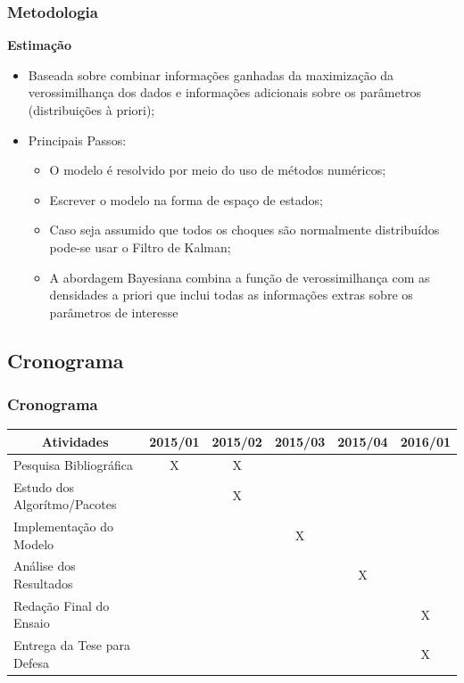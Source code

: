 \documentclass[aspectratio=169]{beamer}
\begin{document}
\begin{frame}\frametitle{Metodologia}
  \textbf{Estimação}
  \begin{itemize}
  \item Baseada sobre combinar informações ganhadas da maximização da verossimilhança dos dados e informações adicionais sobre os parâmetros (distribuições à priori);
  \item Principais Passos:
    \begin{itemize}
    \item O modelo é resolvido por meio do uso de métodos numéricos;
    \item Escrever o modelo na forma de espaço de estados;
    \item Caso seja assumido que todos os choques são normalmente distribuídos pode-se usar o Filtro de Kalman;
    \item A abordagem Bayesiana combina a função de verossimilhança com as densidades a priori que inclui todas as informações extras sobre os parâmetros de interesse
    \end{itemize}
  \end{itemize}
\end{frame}

\subsection{Cronograma}

\begin{frame}\frametitle{Cronograma}
\begin{table}[h]
\begin{tabular}{llllll}
\hline
\multicolumn{1}{c}{\textbf{Atividades}} & 2015/01               & 2015/02               & 2015/03               & 2015/04               & 2016/01               \\ \hline
Pesquisa Bibliográfica                  & \multicolumn{1}{c}{X} & \multicolumn{1}{c}{X} &                       &                       &                       \\
Estudo dos Algorítmo/Pacotes            &                       & \multicolumn{1}{c}{X} &                       &                       &                       \\
Implementação do Modelo                 &                       &                       & \multicolumn{1}{c}{X} &                       &                       \\
Análise dos Resultados                  &                       &                       &                       & \multicolumn{1}{c}{X} &                       \\
Redação Final do Ensaio                  &                       &                       &                       &                       & \multicolumn{1}{c}{X} \\
Entrega da Tese para Defesa             &                       &                       &                       &                       & \multicolumn{1}{c}{X} \\ \hline
\end{tabular}
\end{table}
\end{frame}
\end{document}
